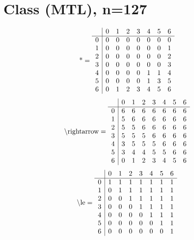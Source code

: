 \documentclass[11pt]{article}
\begin{document}
\section{Class (MTL), n=127}
\[\text{*} = 
\begin{array}{r | r r r r r r r}
 & 0 & 1 & 2 & 3 & 4 & 5 & 6 \\ \hline
0 & 0 & 0 & 0 & 0 & 0 & 0 & 0 \\
1 & 0 & 0 & 0 & 0 & 0 & 0 & 1 \\
2 & 0 & 0 & 0 & 0 & 0 & 0 & 2 \\
3 & 0 & 0 & 0 & 0 & 0 & 0 & 3 \\
4 & 0 & 0 & 0 & 0 & 1 & 1 & 4 \\
5 & 0 & 0 & 0 & 0 & 1 & 3 & 5 \\
6 & 0 & 1 & 2 & 3 & 4 & 5 & 6 \\
\end{array}
\]
\[\text{\textbackslash rightarrow} = 
\begin{array}{r | r r r r r r r}
 & 0 & 1 & 2 & 3 & 4 & 5 & 6 \\ \hline
0 & 6 & 6 & 6 & 6 & 6 & 6 & 6 \\
1 & 5 & 6 & 6 & 6 & 6 & 6 & 6 \\
2 & 5 & 5 & 6 & 6 & 6 & 6 & 6 \\
3 & 5 & 5 & 5 & 6 & 6 & 6 & 6 \\
4 & 3 & 5 & 5 & 5 & 6 & 6 & 6 \\
5 & 3 & 4 & 4 & 5 & 5 & 6 & 6 \\
6 & 0 & 1 & 2 & 3 & 4 & 5 & 6 \\
\end{array}
\]
\[\text{\textbackslash le} = 
\begin{array}{r | r r r r r r r}
 & 0 & 1 & 2 & 3 & 4 & 5 & 6 \\ \hline
0 & 1 & 1 & 1 & 1 & 1 & 1 & 1 \\
1 & 0 & 1 & 1 & 1 & 1 & 1 & 1 \\
2 & 0 & 0 & 1 & 1 & 1 & 1 & 1 \\
3 & 0 & 0 & 0 & 1 & 1 & 1 & 1 \\
4 & 0 & 0 & 0 & 0 & 1 & 1 & 1 \\
5 & 0 & 0 & 0 & 0 & 0 & 1 & 1 \\
6 & 0 & 0 & 0 & 0 & 0 & 0 & 1 \\
\end{array}
\]
\end{document}
